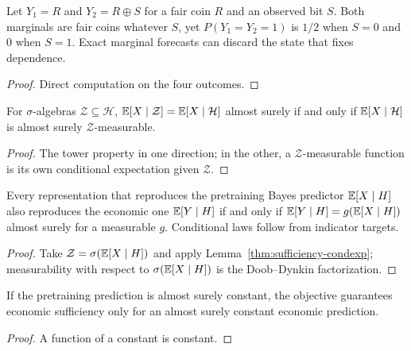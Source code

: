 \begin{lemma}\label{thm:alignment-marginals}
  \leanok
  Let $Y_1=R$ and $Y_2=R\oplus S$ for a fair coin $R$ and an observed bit $S$.
  Both marginals are fair coins whatever $S$, yet
  $P(Y_1=Y_2=1)$ is $1/2$ when $S=0$ and $0$ when $S=1$.
  Exact marginal forecasts can discard the state that fixes dependence.
\end{lemma}
\begin{proof}\leanok
  Direct computation on the four outcomes.
\end{proof}

\begin{lemma}\label{thm:sufficiency-condexp}
  \leanok
  For $\sigma$-algebras $\mathcal Z\subseteq\mathcal H$,
  $\mathbb{E}[X\mid\mathcal Z]=\mathbb{E}[X\mid\mathcal H]$ almost surely if and only if
  $\mathbb{E}[X\mid\mathcal H]$ is almost surely $\mathcal Z$-measurable.
\end{lemma}
\begin{proof}\leanok
  The tower property in one direction; in the other, a $\mathcal Z$-measurable
  function is its own conditional expectation given $\mathcal Z$.
\end{proof}

\begin{theorem}\label{thm:sufficiency-iff}
  \leanok
  Every representation that reproduces the pretraining Bayes predictor
  $\mathbb{E}[X\mid H]$ also reproduces the economic one $\mathbb{E}[Y\mid H]$ if and only if
  $\mathbb{E}[Y\mid H]=g(\mathbb{E}[X\mid H])$ almost surely for a measurable $g$. Conditional
  laws follow from indicator targets.
\end{theorem}
\begin{proof}\leanok
  Take $\mathcal Z=\sigma(\mathbb{E}[X\mid H])$ and apply
  Lemma~\ref{thm:sufficiency-condexp}; measurability with respect to
  $\sigma(\mathbb{E}[X\mid H])$ is the Doob--Dynkin factorization.
\end{proof}

\begin{corollary}\label{thm:sufficiency-constant}
  \leanok
  If the pretraining prediction is almost surely constant, the objective
  guarantees economic sufficiency only for an almost surely constant economic
  prediction.
\end{corollary}
\begin{proof}\leanok
  A function of a constant is constant.
\end{proof}

